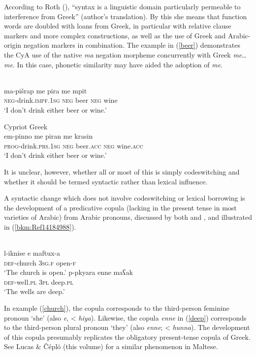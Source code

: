 \documentclass[output=paper]{langsci/langscibook}
\begin{document}
According to Roth (\citeyear[70]{Roth2004}), “syntax is a linguistic domain particularly permeable to interference from Greek” (author’s translation). By this she means that function words are doubled with loans from Greek, in particular with relative clause markers and more complex constructions, as well as the use of Greek and Arabic-origin negation markers in combination. The example in (\ref{beer}) demonstrates the CyA use of the native \textit{ma} negation morpheme concurrently with Greek \textit{me}…\textit{me}. In this case, phonetic similarity may have aided the adoption of \textit{me}. 

\ea\label{beer}
\ea {}\\
\gll ma-pišrap me pira me mpit\\
    \textsc{neg}-drink.\textsc{impf.1sg} \textsc{neg} beer \textsc{neg} wine  \\
\glt ‘I don’t drink either beer or wine.’

\ex\label{ex:walter:}
Cypriot Greek\\
\gll em-pinno me piran me krasin\\
    \textsc{prog}-drink.\textsc{prs.1sg} \textsc{neg}  beer.\textsc{acc} \textsc{neg} wine.\textsc{acc} \\
\glt ‘I don’t drink either beer or wine.’
\z
\z

It is unclear, however, whether all or most of this is simply codeswitching and whether it should be termed syntactic rather than lexical influence. 

A syntactic change which does not involve codeswitching or lexical borrowing is the development of a predicative copula (lacking in the present tense in most varieties of Arabic) from Arabic pronouns, discussed by both \citet{Roth2004} and \citet{Borg1985}, and illustrated in (\ref{bkm:Ref14184988}). 


\ea {}\label{bkm:Ref14184988}\\
\ea \gll l-iknise e maftux-a\\
     \textsc{def}-church \textsc{3sg.f} open-\textsc{f}  \\
\glt ‘The church is open.’ \label{church}
\ex \gll p-pkyara enne maʕak\\
     \textsc{def}-well.\textsc{pl}  \textsc{3pl} deep.\textsc{pl}\\
\glt ‘The wells are deep.’ \label{deep}
\z
\z

In example (\ref{church}), the copula corresponds to the third-person feminine pronoun ‘she’ (also \textit{e}, < \textit{hiya}). Likewise, the copula \textit{enne} in (\ref{deep}) corresponds to the third-person plural pronoun ‘they’ (also \textit{enne}; < \textit{hunna}). The development of this copula presumably replicates the obligatory present-tense copula of Greek. See Lucas \& Čéplö (this volume) for a similar phenomenon in Maltese.
\end{document}
